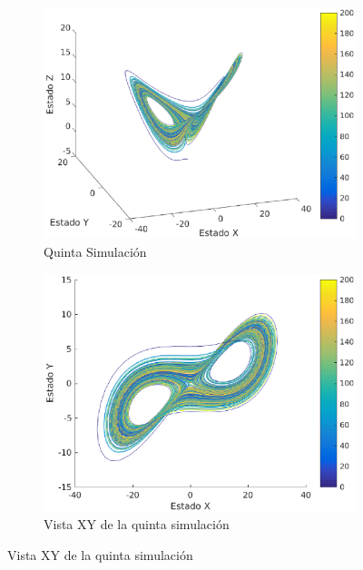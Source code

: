 \documentclass[12pt,letterpaper]{article}
\begin{document}

\begin{figure}
	\centering
	\begin{subfigure}[t]{0.36\textwidth}
		\includegraphics[width=\textwidth]{pictures/quinta_simulacion}
		\caption{Quinta Simulación}
		\label{fig:simulacion4}
	\end{subfigure}
	\begin{subfigure}[t]{0.36\textwidth}
		\includegraphics[width=\textwidth]{pictures/quinta_simulacion_xy}
		\caption{Vista XY de la quinta simulación}
		\label{fig:simulacion4xy}

\end{subfigure}
\end{figure}
\end{document}
